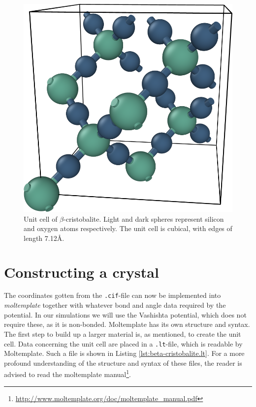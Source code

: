 \documentclass[twoside,english]{uiofysmaster}
\begin{document}
\begin{figure}
	\centering
	\includegraphics[width=0.5\linewidth]{figures/unitcell/unitcell.png}
	\caption{Unit cell of $\beta$-cristobalite. Light and dark spheres represent silicon and oxygen atoms respectively. The unit cell is cubical, with edges of length 7.12Å.}
	\label{fig:unitcellbcristobalite}
\end{figure}



\section{Constructing a crystal}
The coordinates gotten from the \texttt{.cif}-file can now be implemented into \textit{moltemplate} together with whatever bond and angle data required by the potential. In our simulations we will use the Vashishta potential, which does not require these, as it is non-bonded. 
Moltemplate has its own structure and syntax. 
The first step to build up a larger material is, as mentioned, to create the unit cell. 
Data concerning the unit cell are placed in a \texttt{.lt}-file, which is readable by Moltemplate. 
Such a file is shown in Listing \ref{lst:beta-cristobalite.lt}. 
For a more profound understanding of the structure and syntax of these files, the reader is advised to read the moltemplate manual\footnote{\url{http://www.moltemplate.org/doc/moltemplate_manual.pdf}}.
\end{document}
